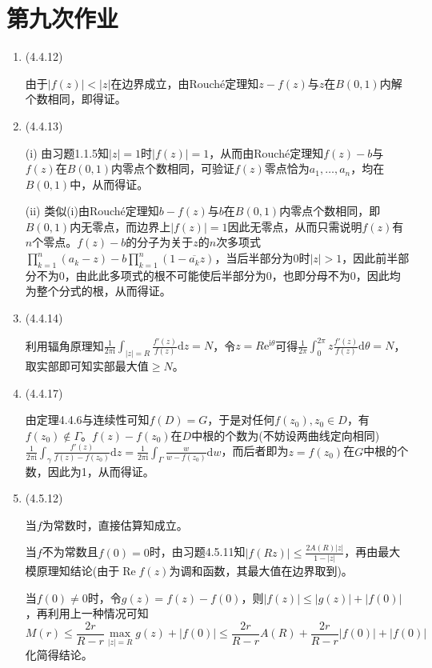 \documentclass[a4paper,UTF8,fontset=windows]{ctexart}
\DeclareMathOperator{\re}{Re}
\begin{document}
\section{第九次作业}
\begin{enumerate}
    \item (4.4.12)
    
    由于$|f(z)|<|z|$在边界成立，由Rouch\'e定理知$z-f(z)$与$z$在$B(0,1)$内解个数相同，即得证。
    
    \item (4.4.13)
    
    (i) 由习题1.1.5知$|z|=1$时$|f(z)|=1$，从而由Rouch\'e定理知$f(z)-b$与$f(z)$在$B(0,1)$内零点个数相同，可验证$f(z)$零点恰为$a_1,\dots,a_n$，均在$B(0,1)$中，从而得证。
    
    (ii) 类似(i)由Rouch\'e定理知$b-f(z)$与$b$在$B(0,1)$内零点个数相同，即$B(0,1)$内无零点，而边界上$|f(z)|=1$因此无零点，从而只需说明$f(z)$有$n$个零点。$f(z)-b$的分子为关于$z$的$n$次多项式$\prod_{k=1}^n(a_k-z)-b\prod_{k=1}^n(1-\overline{a_k}z)$，当后半部分为0时$|z|>1$，因此前半部分不为0，由此此多项式的根不可能使后半部分为0，也即分母不为0，因此均为整个分式的根，从而得证。
    
    \item (4.4.14)
    
    利用辐角原理知$\frac{1}{2\pi\mathrm{i}}\int_{|z|=R}\frac{f'(z)}{f(z)}\mathrm{d}z=N$，令$z=R\mathrm{e}^{\mathrm{i}\theta}$可得$\frac{1}{2\pi}\int_0^{2\pi}z\frac{f'(z)}{f(z)}\mathrm{d}\theta=N$，取实部即可知实部最大值$\ge N$。
    
    \item (4.4.17)
    
    由定理4.4.6与连续性可知$f(D)=G$，于是对任何$f(z_0),z_0\in D$，有$f(z_0)\notin\Gamma$。$f(z)-f(z_0)$在$D$中根的个数为(不妨设两曲线定向相同)$\frac{1}{2\pi\mathrm{i}}\int_\gamma\frac{f'(z)}{f(z)-f(z_0)}\mathrm{d}z=\frac{1}{2\pi\mathrm{i}}\int_\Gamma\frac{w}{w-f(z_0)}\mathrm{d}w$，而后者即为$z=f(z_0)$在$G$中根的个数，因此为1，从而得证。
    
    \item (4.5.12)
    
    当$f$为常数时，直接估算知成立。
    
    当$f$不为常数且$f(0)=0$时，由习题4.5.11知$|f(Rz)|\le\frac{2A(R)|z|}{1-|z|}$，再由最大模原理知结论(由于$\re f(z)$为调和函数，其最大值在边界取到)。
    
    当$f(0)\ne0$时，令$g(z)=f(z)-f(0)$，则$|f(z)|\le|g(z)|+|f(0)|$，再利用上一种情况可知
    \[M(r)\le\frac{2r}{R-r}\max_{|z|=R}g(z)+|f(0)|\le\frac{2r}{R-r}A(R)+\frac{2r}{R-r}|f(0)|+|f(0)|\]
    化简得结论。
    

\end{enumerate}
\end{document}
